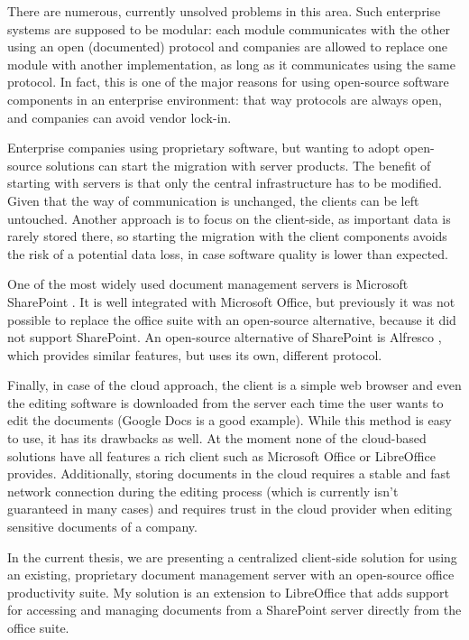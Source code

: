 There are numerous, currently unsolved problems in this area. Such enterprise
systems are supposed to be modular: each module communicates with the other
using an open (documented) protocol and companies are allowed to replace one
module with another implementation, as long as it communicates using the same
protocol. In fact, this is one of the major reasons for using open-source
software components in an enterprise environment: that way protocols are always
open, and companies can avoid vendor lock-in.

Enterprise companies using proprietary software, but wanting to adopt
open-source solutions can start the migration with server products. The benefit
of starting with servers is that only the central infrastructure has to be
modified. Given that the way of communication is unchanged, the clients can be left
untouched. Another approach is to focus on the client-side, as important data
is rarely stored there, so starting the migration with the client components
avoids the risk of a potential data loss, in case software quality is lower
than expected.

One of the most widely used document management servers is Microsoft
SharePoint \cite{sharepoint}. It is well integrated with Microsoft Office, but
previously it was not possible to replace the office suite with an open-source
alternative, because it did not support SharePoint. An open-source alternative
of SharePoint is Alfresco \cite{alfresco}, which provides similar features, but
uses its own, different protocol.

Finally, in case of the cloud approach, the client is a simple web browser and
even the editing software is downloaded from the server each time the user
wants to edit the documents (Google Docs \cite{google-docs} is a good example).
While this method is easy to use, it has its drawbacks as well. At the moment
none of the cloud-based solutions have all features a rich client such as
Microsoft Office or LibreOffice provides.  Additionally, storing documents in
the cloud requires a stable and fast network connection during the editing
process (which is currently isn't guaranteed in many cases) and requires trust
in the cloud provider when editing sensitive documents of a company.

In the current thesis, we are presenting a centralized client-side solution for
using an existing, proprietary document management server with an open-source
office productivity suite. My solution is an extension to LibreOffice that adds
support for accessing and managing documents from a SharePoint server directly
from the office suite.

